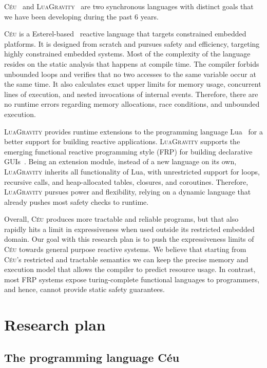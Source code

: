 \documentclass[pdftex,12pt,a4paper]{article}
\newcommand{\CEU}{\textsc{C\'{e}u}\xspace}
\newcommand{\GVT}{\textsc{LuaGravity}\xspace}
\begin{document}
\CEU~\cite{ceu.tr,ceu.phd,ceu.sensys13,ceu.rem13}
and
\GVT~\cite{luagravity.sblp,luagravity.msc}
are two synchronous languages with distinct goals that we have been developing 
during the past 6 years.

\CEU is a Esterel-based~\cite{esterel.ieee91} reactive language that targets 
constrained embedded platforms.
It is designed from scratch and pursues safety and efficiency, targeting highly 
constrained embedded systems.
Most of the complexity of the language resides on the static analysis that 
happens at compile time.
The compiler forbids unbounded loops and verifies that no two accesses to the 
same variable occur at the same time.
It also calculates exact upper limits for memory usage, concurrent lines of 
execution, and nested invocations of internal events.
Therefore, there are no runtime errors regarding memory allocations, race 
conditions, and unbounded execution.

\GVT provides runtime extensions to the programming language Lua~\cite{lua.pil} 
for a better support for building reactive applications.
\GVT supports the emerging functional reactive programming style (FRP) for 
building declarative GUIs~\cite{frp.flapjax,frp.elm,frp.survey}.
Being an extension module, instead of a new language on its own, \GVT inherits 
all functionality of Lua, with unrestricted support for loops, recursive calls, 
and heap-allocated tables, closures, and coroutines.
Therefore, \GVT pursues power and flexibility, relying on a dynamic language 
that already pushes most safety checks to runtime.

Overall, \CEU produces more tractable and reliable programs, but that also 
rapidly hits a limit in expressiveness when used outside its restricted 
embedded domain.
%
Our goal with this research plan is to push the expressiveness limits of \CEU 
towards general purpose reactive systems.
%
We believe that starting from \CEU's restricted and tractable semantics we can 
keep the precise memory and execution model that allows the compiler to predict 
resource usage.
%
In contrast, most FRP systems expose turing-complete functional languages to 
programmers, and hence, cannot provide static safety guarantees.

\section{Research plan}

\subsection{The programming language C\'eu}
\end{document}
